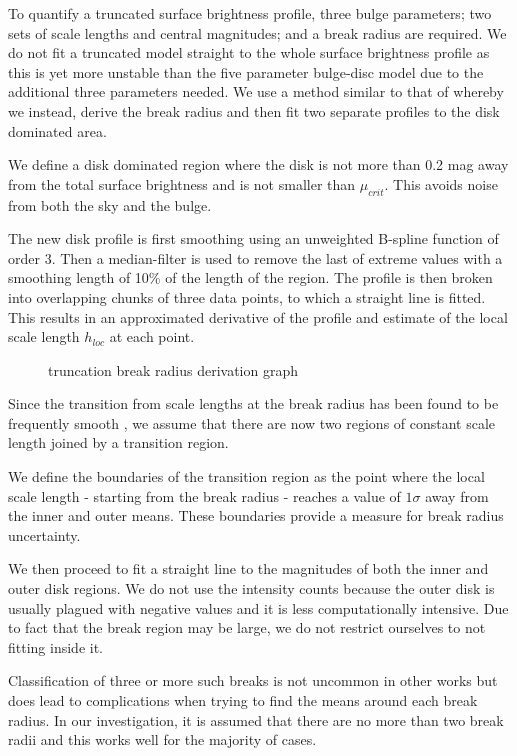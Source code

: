 To quantify a truncated surface brightness profile, three bulge parameters; two sets of scale lengths and central magnitudes; and a break radius are required. We do not fit a truncated model straight to the whole surface brightness profile as this is yet more unstable than the five parameter bulge-disc model due to the additional three parameters needed. We use a method similar to that of \citet{pohlen_structure_2006} whereby we instead, derive the break radius and then fit two separate profiles to the disk dominated area.

We define a disk dominated region where the disk is not more than 0.2 mag away from the total surface brightness and is not smaller than $\mu_{crit}$. This avoids noise from both the sky and the bulge.

The new disk profile is first smoothing using an unweighted B-spline function \citep{dierckx_curve_1975} of order 3. Then a median-filter is used to remove the last of extreme values with a smoothing length of 10\% of the length of the region.
The profile is then broken into overlapping chunks of three data points, to which a straight line is fitted. This results in an approximated derivative of the profile and estimate of the local scale length $h_{loc}$ at each point. 

\begin{figure}
	\caption{truncation break radius derivation graph}
\end{figure}

Since the transition from scale lengths at the break radius has been found to be frequently smooth \citep{erwin_outer_2008,pohlen_stellar_2004,maltby_anti-truncated_2011}, we assume that there are now two regions of constant scale length joined by a transition region. 

We define the boundaries of the transition region as the point where the local scale length - starting from the break radius - reaches a value of $1\sigma$ away from the inner and outer means. These boundaries provide a measure for break radius uncertainty. 

We then proceed to fit a straight line to the magnitudes of both the inner and outer disk regions. We do not use the intensity counts because the outer disk is usually plagued with negative values and it is less computationally intensive. Due to fact that the break region may be large, we do not restrict ourselves to not fitting inside it.

Classification of three or more such breaks is not uncommon in other works \citep{pohlen_structure_2006,gutierrez_outer_2011} but does lead to complications when trying to find the means around each break radius. In our investigation, it is assumed that there are no more than two break radii and this works well for the majority of cases. 

